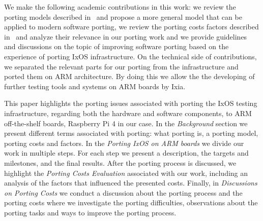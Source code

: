 We make the following academic contributions in this work: we review the porting models
described in~\cite{b1,b2,b9} and propose a more general model that can be
applied to modern software porting, we review the porting costs factors
described in~\cite{b2} and analyze their relevance in our porting work and we
provide guidelines and discussions on the topic of improving software porting
based on the experience of porting IxOS infrastructure. On the technical side of
contributions, we separated the relevant parts for our porting from the
infrastructure and ported them on ARM architecture. By doing this we allow the
the developing of further testing tools and systems on ARM boards by Ixia.

This paper highlights the porting issues associated with porting the IxOS
testing infrastructure, regarding both the hardware and software components, to
ARM off-the-shelf boards, Raspberry Pi 4 in our case. In the \textit{Background}
section we present different terms associated with porting: what porting is, a
porting model, porting costs and factors. In the \textit{Porting IxOS on ARM
boards} we divide our work in multiple steps. For each step we present a
description, the targets and milestones, and the final results.  After the
porting process is discussed, we highlight the \textit{Porting Costs Evaluation}
associated with our work, including an analysis of the factors that influenced
the presented costs.  Finally, in \textit{Discussions on Porting Costs} we
conduct a discussion about the porting process and the porting costs where we
investigate the porting difficulties, observations about the porting tasks and
ways to improve the porting process. 
